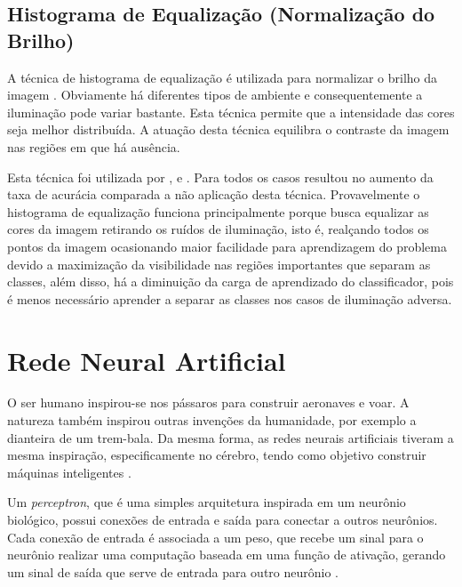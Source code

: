 \subsection{Histograma de Equalização (Normalização do Brilho)}
A técnica de histograma de equalização é utilizada para normalizar o brilho da imagem \citep{jain1989fundamentals}. Obviamente há diferentes tipos de ambiente e consequentemente a iluminação pode variar bastante. Esta técnica permite que a intensidade das cores seja melhor distribuída. A atuação desta técnica equilibra o contraste da imagem nas regiões em que há ausência.

Esta técnica foi utilizada por \cite{art2}, \cite{art4} e \cite{art6}. Para todos os casos resultou no aumento da taxa de acurácia comparada a não aplicação desta técnica. Provavelmente o histograma de equalização funciona principalmente porque busca equalizar as cores da imagem retirando os ruídos de iluminação, isto é, realçando todos os pontos da imagem ocasionando maior facilidade para aprendizagem do problema devido a maximização da visibilidade nas regiões importantes que separam as classes, além disso, há a diminuição da carga de aprendizado do classificador, pois é menos necessário aprender a separar as classes nos casos de iluminação adversa.



\section{Rede Neural Artificial}\label{sec:rna}
O ser humano inspirou-se nos pássaros para construir aeronaves e voar. A natureza também inspirou outras invenções da humanidade, por exemplo a dianteira de um trem-bala. Da mesma forma, as redes neurais artificiais tiveram a mesma inspiração, especificamente no cérebro, tendo como objetivo construir máquinas inteligentes \citep{geron2017hands, goodfellow2016deep}. 

Um \textit{perceptron}, que é uma simples arquitetura inspirada em um neurônio biológico, possui conexões de entrada e saída para conectar a outros neurônios. Cada conexão de entrada é associada a um peso, que recebe um sinal para o neurônio realizar uma computação baseada em uma função de ativação, gerando um sinal de saída que serve de entrada para outro neurônio \citep{geron2017hands}. 

